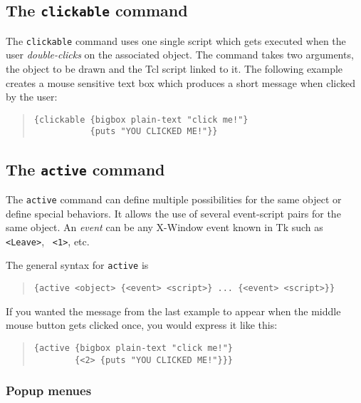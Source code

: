 \subsection{The {\tt clickable} command}

The {\tt clickable} command uses one single script which gets executed
when the user {\it double-clicks\/} on the associated object.  The
command takes two arguments, the object to be drawn and the {\sc Tcl}
script linked to it.  The following example creates a mouse sensitive
text box which produces a short message when clicked by the user:

\begin{quote}
\begin{verbatim}
{clickable {bigbox plain-text "click me!"} 
           {puts "YOU CLICKED ME!"}}
\end{verbatim}
\end{quote}

\subsection{The {\tt active} command}

The {\tt active} command can define multiple possibilities for the
same object or define special behaviors.  It allows the use of
several event-script pairs for the same object. An {\it event\/} can
be any X-Window event known in {\sc Tk} such as {\tt <Leave>}, {\tt
<1>}, {\tt <Double-3>} etc.

The general syntax for {\tt active} is 

\begin{quote}
\begin{verbatim}
{active <object> {<event> <script>} ... {<event> <script>}}
\end{verbatim}
\end{quote}
If you wanted the message from the last example to appear when the
middle mouse button gets clicked once, you would express it like this:

\begin{quote}
\begin{verbatim}
{active {bigbox plain-text "click me!"} 
        {<2> {puts "YOU CLICKED ME!"}}}
\end{verbatim}
\end{quote}

\subsubsection{Popup menues}

